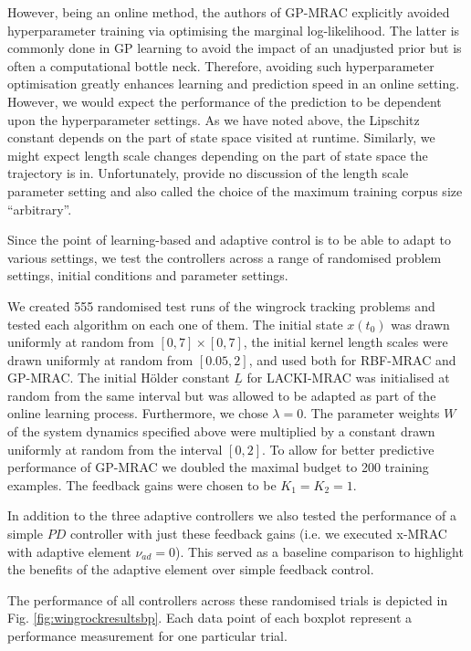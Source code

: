 \documentclass{article} %
\theoremstyle{definition}
\theoremstyle{remark}
\newcommand{\hestthresh}{\ensuremath{ \lambda}}
\begin{document}
However, being an online method, the authors of GP-MRAC explicitly avoided hyperparameter training via optimising the marginal log-likelihood. The latter is commonly done in GP learning \cite{GPbook:2006} to avoid the impact of an unadjusted prior but is often a computational bottle neck. Therefore, avoiding such hyperparameter optimisation greatly enhances learning and prediction speed in an online setting. However, we would expect the performance of the prediction to be dependent upon the hyperparameter settings. As we have noted above, the Lipschitz constant depends on the part of state space visited at runtime. Similarly, we might expect length scale changes depending on the part of state space the trajectory is in. Unfortunately, \cite{Chowdhary2013,ChowdharyCDC2013,chowdharyacc2013} provide no discussion of the length scale parameter setting and also called the choice of the maximum training corpus size ``arbitrary''. 

Since the point of learning-based and adaptive control is to be able to adapt to various settings, we test the controllers across a range of randomised problem settings, initial conditions and parameter settings.

We created 555 randomised test runs of the wingrock tracking problems and tested each algorithm on each one of them. The initial state $x(t_0)$ was drawn uniformly at random from $[0,7] \times [0,7]$, the initial kernel length scales were drawn uniformly at random from $[0.05,2]$, and used both for RBF-MRAC and GP-MRAC. The initial H\"older constant $\underline L$ for LACKI-MRAC was initialised at random from the same interval but was allowed to be adapted as part of the online learning process. Furthermore, we chose $\hestthresh =0$. The parameter weights $W$ of the system dynamics specified above were multiplied by a constant drawn uniformly at random from the interval $[0,2]$. To allow for better predictive performance of GP-MRAC we doubled the maximal budget to 200 training examples. 
The feedback gains were chosen to be $K_1=K_2=1$. 

In addition to the three adaptive controllers we also tested the performance of a simple $PD$ controller with just these feedback gains (i.e. we executed x-MRAC with adaptive element $\nu_{ad}=0$). This served as a baseline comparison to highlight the benefits of the adaptive element over simple feedback control.

The performance of all controllers across these randomised trials is depicted in Fig. \ref{fig:wingrockresultsbp}. Each data point of each boxplot represent a performance measurement for one particular trial.
\end{document}
